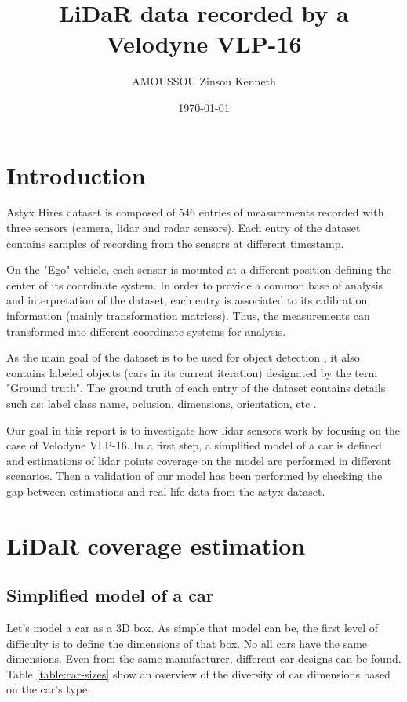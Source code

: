 \documentclass{scrartcl}
\title{LiDaR data recorded by a Velodyne VLP-16}
\author{AMOUSSOU Zinsou Kenneth}
\date{\today}
\begin{document}
	\maketitle
	\tableofcontents

	\clearpage
  
  \section{Introduction}

  Astyx Hires dataset \cite{astyx} is composed of 546 entries of measurements
  recorded with three sensors (camera, lidar and radar sensors). Each entry of
  the dataset contains samples of recording from the sensors at different
  timestamp.

  On the "Ego" vehicle, each sensor is mounted at a different position
  defining the center of its coordinate system.
  In order to provide a common base of analysis and interpretation of the
  dataset, each entry is associated to its calibration information
  (mainly transformation matrices). Thus, the measurements can transformed into
  different coordinate systems for analysis.

  As the main goal of the dataset is to be used for object detection
  \cite{astyx}, it also contains labeled objects (cars in its current
  iteration) designated by the term "Ground truth". The ground truth of each
  entry of the dataset contains details such as: label class name, oclusion,
  dimensions, orientation, etc \cite{astyx-spec}.

  Our goal in this report is to investigate how lidar sensors work by focusing
  on the case of Velodyne VLP-16. In a first step, a simplified model of a car
  is defined and estimations of lidar points coverage on the model are
  performed in different scenarios. Then a validation of our model has been  
  performed by checking the gap between estimations and real-life data from the
  astyx dataset.

  \section{LiDaR coverage estimation}
    \subsection{Simplified model of a car}

    Let's model a car as a 3D box. As simple that model can be, the first level
    of difficulty is to define the dimensions of that box. No all cars have the
    same dimensions. Even from the same manufacturer, different car designs
    can be found.
    Table \ref{table:car-sizes} show an overview of the diversity of car
    dimensions based on the car's type.
\end{document}
